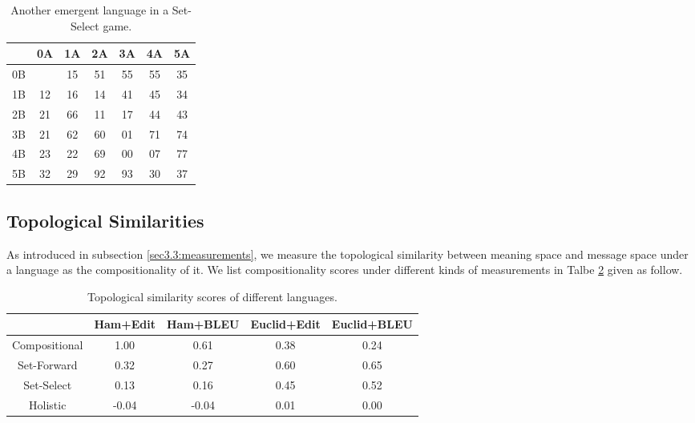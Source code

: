 \begin{table}[!h]
    \centering
    \begin{tabular}{|c|c|c|c|c|c|c|}
        \hline
           & 0A & 1A & 2A & 3A & 4A & 5A \\ \hline
        0B &    & 15 & 51 & 55 & 55 & 35 \\ \hline
        1B & 12 & 16 & 14 & 41 & 45 & 34 \\ \hline
        2B & 21 & 66 & 11 & 17 & 44 & 43 \\ \hline
        3B & 21 & 62 & 60 & 01 & 71 & 74 \\ \hline
        4B & 23 & 22 & 69 & 00 & 07 & 77 \\ \hline
        5B & 32 & 29 & 92 & 93 & 30 & 37 \\ \hline
        \end{tabular}
    \caption{Another emergent language in a Set-Select game.}
    \label{tab4.4:emregent_language_referential2}
\end{table}

\subsection{Topological Similarities}
\label{ssec4.2.2:topo_sim}

As introduced in subsection \ref{sec3.3:measurements}, we measure the topological similarity between meaning space and message space under a language as the compositionality of it. We list compositionality scores under different kinds of measurements in Talbe \ref{tab4.4:topo_sim_lans} given as follow.

\begin{table}[!h]
    \centering
    \begin{tabular}{|c|c|c|c|c|}
        \hline
                      & Ham+Edit & Ham+BLEU & Euclid+Edit & Euclid+BLEU \\ \hline
        Compositional & 1.00     & 0.61     & 0.38        & 0.24        \\ \hline
        Set-Forward   & 0.32     & 0.27     & 0.60        & 0.65        \\ \hline
        Set-Select    & 0.13     & 0.16     & 0.45        & 0.52        \\ \hline
        Holistic      & -0.04    & -0.04    & 0.01        & 0.00        \\ \hline
    \end{tabular}
    \caption{Topological similarity scores of different languages.}
    \label{tab4.4:topo_sim_lans}
\end{table}

